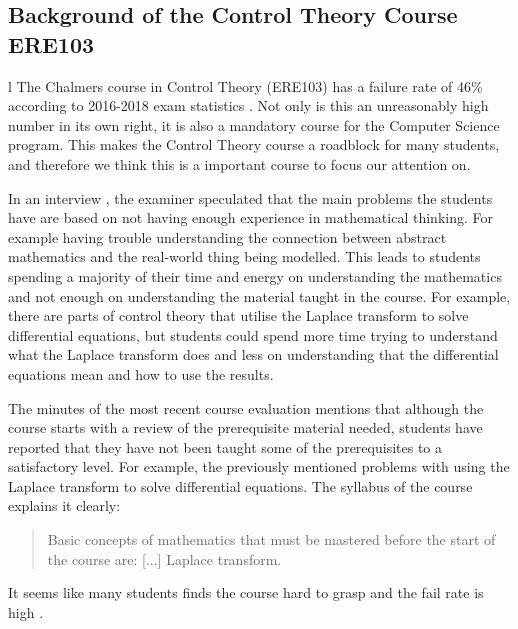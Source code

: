 \subsection{Background of the Control Theory Course ERE103}l\label{backgroundERE}
The Chalmers course in Control Theory (ERE103) has a failure rate of 46\% according to 2016-2018 exam statistics \cite{data_program_blad_2018}. Not only is this an unreasonably high number in its own right, it is also a mandatory course for the Computer Science program. This makes the Control Theory course a roadblock for many students, and therefore we think this is a important course to focus our attention on.

In an interview \cite{tssarbete}, the examiner speculated that the main problems the students have are based on not having enough experience in mathematical thinking. For example having trouble understanding the connection between abstract mathematics and the real-world thing being modelled.
This leads to students spending a majority of their time and energy on understanding the mathematics and not enough on understanding the material taught in the course. For example, there are parts of control theory that utilise the Laplace transform to solve differential equations, but students could spend more time trying to understand what the Laplace transform does and less on understanding that the differential equations mean and how to use the results. 

The minutes of the most recent course evaluation mentions that although the course starts with a review of the prerequisite material needed, students have reported that they have not been taught some of the prerequisites to a satisfactory level. For example, the previously mentioned problems with using the Laplace transform to solve differential equations. The syllabus \cite{ERE103} of the course explains it clearly:
\begin{quote}
    Basic concepts of mathematics that must be mastered before the start of the course are: [...] Laplace transform.
\end{quote} %
It seems like many students finds the course hard to grasp and the fail rate is high \cite{exam_stat_regler}.




